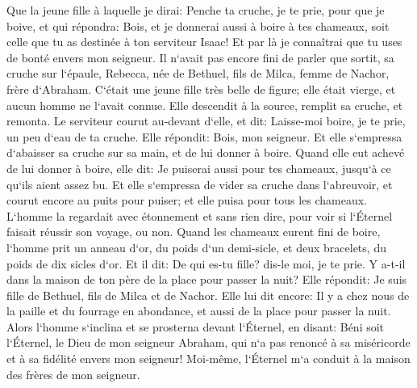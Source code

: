 \verse Que la jeune fille à laquelle je dirai: Penche ta cruche, je te prie, pour que je boive, et qui répondra: Bois, et je donnerai aussi à boire à tes chameaux, soit celle que tu as destinée à ton serviteur Isaac! Et par là je connaîtrai que tu uses de bonté envers mon seigneur. 
\verse Il n`avait pas encore fini de parler que sortit, sa cruche sur l`épaule, Rebecca, née de Bethuel, fils de Milca, femme de Nachor, frère d`Abraham. 
\verse C`était une jeune fille très belle de figure; elle était vierge, et aucun homme ne l`avait connue. Elle descendit à la source, remplit sa cruche, et remonta. 
\verse Le serviteur courut au-devant d`elle, et dit: Laisse-moi boire, je te prie, un peu d`eau de ta cruche. 
\verse Elle répondit: Bois, mon seigneur. Et elle s`empressa d`abaisser sa cruche sur sa main, et de lui donner à boire. 
\verse Quand elle eut achevé de lui donner à boire, elle dit: Je puiserai aussi pour tes chameaux, jusqu`à ce qu`ils aient assez bu. 
\verse Et elle s`empressa de vider sa cruche dans l`abreuvoir, et courut encore au puits pour puiser; et elle puisa pour tous les chameaux. 
\verse L`homme la regardait avec étonnement et sans rien dire, pour voir si l`Éternel faisait réussir son voyage, ou non. 
\verse Quand les chameaux eurent fini de boire, l`homme prit un anneau d`or, du poids d`un demi-sicle, et deux bracelets, du poids de dix sicles d`or. 
\verse Et il dit: De qui es-tu fille? dis-le moi, je te prie. Y a-t-il dans la maison de ton père de la place pour passer la nuit? 
\verse Elle répondit: Je suis fille de Bethuel, fils de Milca et de Nachor. 
\verse Elle lui dit encore: Il y a chez nous de la paille et du fourrage en abondance, et aussi de la place pour passer la nuit. 
\verse Alors l`homme s`inclina et se prosterna devant l`Éternel, 
\verse en disant: Béni soit l`Éternel, le Dieu de mon seigneur Abraham, qui n`a pas renoncé à sa miséricorde et à sa fidélité envers mon seigneur! Moi-même, l`Éternel m`a conduit à la maison des frères de mon seigneur. 
